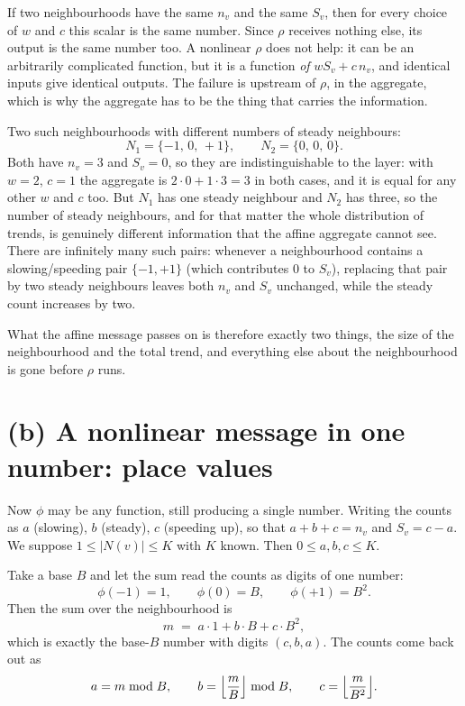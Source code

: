 \documentclass[11pt,letterpaper]{article}
\begin{document}
If two neighbourhoods have the same $n_v$ and the same $S_v$, then for every choice of $w$ and
$c$ this scalar is the same number. Since $\rho$ receives nothing else, its output is the same
number too. A nonlinear $\rho$ does not help: it can be an arbitrarily complicated function,
but it is a function \emph{of} $w S_v + c\, n_v$, and identical inputs give identical outputs.
The failure is upstream of $\rho$, in the aggregate, which is why the aggregate has to be the
thing that carries the information.

Two such neighbourhoods with different numbers of steady neighbours:
\begin{equation*}
N_1 = \{-1,\, 0,\, +1\}, \qquad N_2 = \{0,\, 0,\, 0\}.
\end{equation*}
Both have $n_v = 3$ and $S_v = 0$, so they are indistinguishable to the layer: with $w = 2$,
$c = 1$ the aggregate is $2 \cdot 0 + 1 \cdot 3 = 3$ in both cases, and it is equal for any
other $w$ and $c$ too. But $N_1$ has one steady neighbour and $N_2$ has three, so the number of
steady neighbours, and for that matter the whole distribution of trends, is genuinely
different information that the affine aggregate cannot see. There are infinitely many such
pairs: whenever a neighbourhood contains a slowing/speeding pair $\{-1, +1\}$ (which
contributes $0$ to $S_v$), replacing that pair by two steady neighbours leaves both $n_v$ and
$S_v$ unchanged, while the steady count increases by two.

What the affine message passes on is therefore exactly two things, the size of the
neighbourhood and the total trend, and everything else about the neighbourhood is gone before
$\rho$ runs.

\section*{(b) A nonlinear message in one number: place values}

Now $\phi$ may be any function, still producing a single number.
Writing the counts as $a$ (slowing), $b$ (steady), $c$ (speeding up), so that $a + b + c = n_v$
and $S_v = c - a$. We suppose $1 \le |N(v)| \le K$ with $K$ known. Then $0 \le a, b, c \le K$.

Take a base $B$ and let the sum read the counts as digits of one number:
\begin{equation*}
\phi(-1) = 1, \qquad \phi(0) = B, \qquad \phi(+1) = B^2 .
\end{equation*}
Then the sum over the neighbourhood is
\begin{equation*}
m \;=\; a \cdot 1 + b \cdot B + c \cdot B^2,
\end{equation*}
which is exactly the base-$B$ number with digits $(c, b, a)$. The counts come back out as
\begin{equation*}
a = m \bmod B, \qquad
b = \Bigl\lfloor \frac{m}{B} \Bigr\rfloor \bmod B, \qquad
c = \Bigl\lfloor \frac{m}{B^2} \Bigr\rfloor .
\end{equation*}
\end{document}
